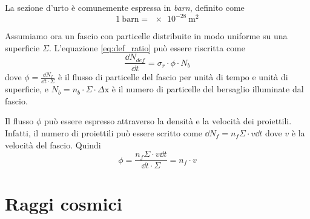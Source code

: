 \documentclass[../main.tex]{subfiles}
\begin{document}
La sezione d'urto è comunemente espressa in \emph{barn}, definito come
\begin{equation}
    1\ \mathrm{barn} = \SI{e-28}{\m ^2}
\end{equation}

Assumiamo ora un fascio con particelle distribuite in modo uniforme su una superficie $\Sigma$. L'equazione \ref{eq:def_ratio} può essere riscritta come 
\begin{equation}
    \frac{\dd N_{def}}{\dd t} = \sigma_r \cdot \phi \cdot N_b
\end{equation}
dove $\phi = \frac{\dd N_f}{\dd t \cdot \Sigma}$ è il flusso di particelle del fascio per unità di tempo e unità di superficie, e $N_b = n_b \cdot \Sigma \cdot \Delta \mathrm{x}$ è il numero di particelle del bersaglio illuminate dal fascio. 

Il flusso $\phi$ può essere espresso attraverso la densità e la velocità dei proiettili. Infatti, il numero di proiettili può essere scritto come $\dd N_f = n_f \Sigma \cdot v \dd t$ dove $v$ è la velocità del fascio. Quindi 
\begin{equation}
    \phi = \frac{n_f \Sigma \cdot v \dd t}{\dd t \cdot \Sigma} = n_f \cdot v
\end{equation}

\section{Raggi cosmici}
\end{document}
